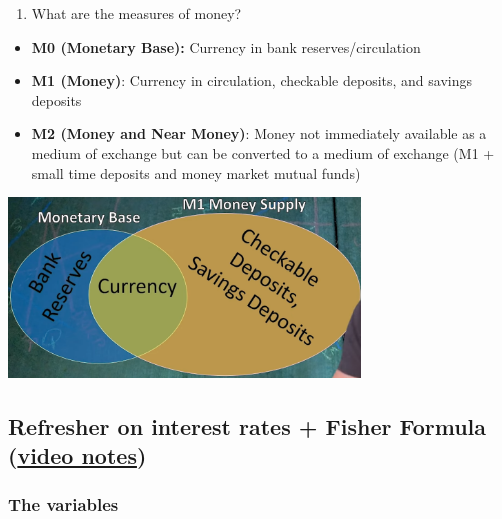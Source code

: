 \documentclass[
  letterpaper,
  DIV=11,
  numbers=noendperiod]{scrartcl}
\providecommand{\tightlist}{%
  \setlength{\itemsep}{0pt}\setlength{\parskip}{0pt}}\usepackage{longtable,booktabs,array}
\begin{document}
\begin{enumerate}
\def\labelenumi{\arabic{enumi}.}
\setcounter{enumi}{3}
\tightlist
\item
  What are the measures of money?
\end{enumerate}

\begin{itemize}
\tightlist
\item
  \textbf{M0 (Monetary Base):} Currency in bank reserves/circulation
\item
  \textbf{M1 (Money)}: Currency in circulation, checkable deposits, and
  savings deposits
\item
  \textbf{M2 (Money and Near Money)}: Money not immediately available as
  a medium of exchange but can be converted to a medium of exchange (M1
  + small time deposits and money market mutual funds)
\end{itemize}

\includegraphics[width=0.7\textwidth,height=\textheight]{img/m0-m1-venn.png}

\subsection{\texorpdfstring{Refresher on interest rates + Fisher Formula
(\href{https://www.youtube.com/watch?v=KfPGfP97NBA}{video
notes})}{Refresher on interest rates + Fisher Formula (video notes)}}\label{refresher-on-interest-rates-fisher-formula-video-notes}

\subsubsection{The variables}\label{the-variables}
\end{document}
